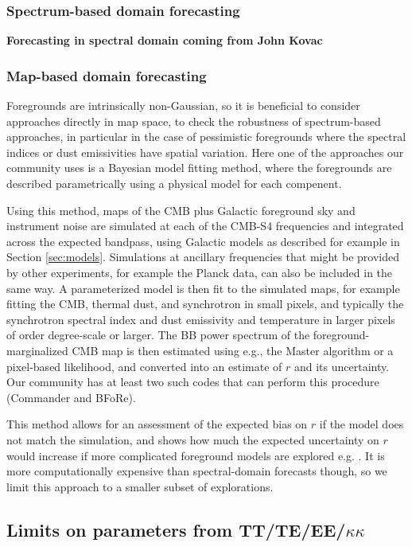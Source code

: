 \subsubsection{Spectrum-based domain forecasting}
{\bf Forecasting in spectral domain coming from John Kovac}

\subsubsection{Map-based domain forecasting}

Foregrounds are intrinsically non-Gaussian, so it is beneficial to consider approaches directly in map space, to check the robustness of spectrum-based approaches, in particular in the case of pessimistic foregrounds where the spectral indices or dust emissivities have spatial variation. Here one of the approaches our community uses is a Bayesian model fitting method, where the foregrounds are described parametrically using a physical model for each compenent.

Using this method, maps of the CMB plus Galactic foreground sky and instrument noise are simulated at each of the CMB-S4 frequencies and integrated across the expected bandpass, using Galactic models as described for example in Section \ref{sec:models}. Simulations at ancillary frequencies that might be provided by other experiments, for example the Planck data, can also be included in the same way. A parameterized model is then fit to the simulated maps, for example fitting the CMB, thermal dust, and synchrotron in small pixels, and typically the synchrotron spectral index and dust emissivity and temperature in larger pixels of order degree-scale or larger. The BB power spectrum of the foreground-marginalized CMB map is then estimated using e.g., the Master algorithm or a pixel-based likelihood, and converted into an estimate of $r$ and its uncertainty. Our community has at least two such codes that can perform this procedure (Commander and BFoRe).

This method allows for an assessment of the expected bias on $r$ if the model does not match the simulation, and shows how much the expected uncertainty on $r$ would increase if more complicated foreground models are explored e.g. \cite{armitage-caplan/etal:2011,ramazeilles/etal:2015}. It is more computationally expensive than spectral-domain forecasts though, so we limit this approach to a smaller subset of explorations. 

\subsection{Limits on parameters from TT/TE/EE/$\kappa\kappa$}

